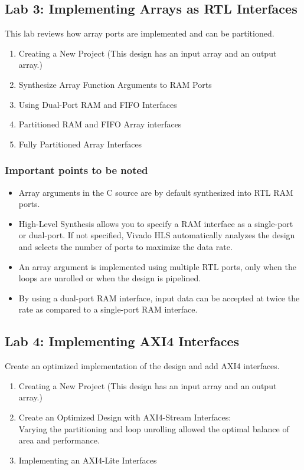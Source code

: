 \subsection{Lab 3: Implementing Arrays as RTL Interfaces}
This lab reviews how array ports are implemented and can be partitioned.

\begin{enumerate}[label=Step \arabic*:]
    \item Creating a New Project (This design has an input array and an output array.)
    \item Synthesize Array Function Arguments to RAM Ports
    \item Using Dual-Port RAM and FIFO Interfaces
    \item Partitioned RAM and FIFO Array interfaces
    \item Fully Partitioned Array Interfaces
\end{enumerate}

\subsubsection{Important points to be noted}
\begin{itemize}
    \item Array arguments in the C source are by default synthesized into RTL RAM ports.
    \item High-Level Synthesis allows you to specify a RAM interface as a single-port or dual-port. If not specified, Vivado HLS automatically analyzes the design and selects the number of ports to maximize the data rate.
    \item An array argument is implemented using multiple RTL ports, only when the loops are unrolled or when the design is pipelined.
    \item By using a dual-port RAM interface, input data can be accepted at twice the rate as compared to a single-port RAM interface.
\end{itemize}

\subsection{Lab 4: Implementing AXI4 Interfaces}
Create an optimized implementation of the design and add AXI4 interfaces.

\begin{enumerate}[label=Step \arabic*:]
    \item Creating a New Project (This design has an input array and an output array.)
    \item Create an Optimized Design with AXI4-Stream Interfaces:\\ Varying the partitioning and loop unrolling allowed the optimal balance of area and performance.
    \item Implementing an AXI4-Lite Interfaces
\end{enumerate}

